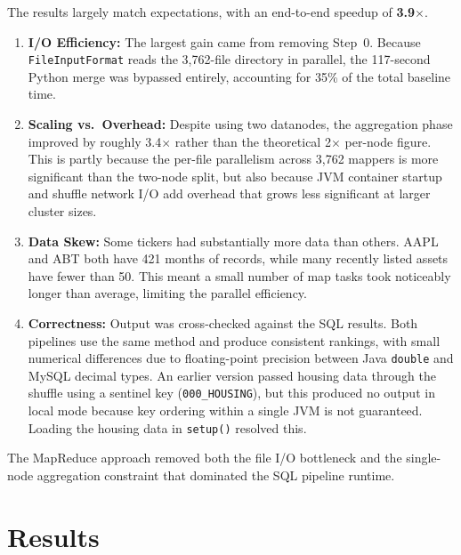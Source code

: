 \documentclass[11pt]{article}
\begin{document}
The results largely match expectations, with an end-to-end speedup of \textbf{3.9$\times$}.

\begin{enumerate}

\item \textbf{I/O Efficiency:} The largest gain came from removing Step~0. Because \texttt{FileInputFormat} reads the 3,762-file directory in parallel, the 117-second Python merge was bypassed entirely, accounting for 35\% of the total baseline time.

\item \textbf{Scaling vs.\ Overhead:} Despite using two datanodes, the aggregation phase improved by roughly 3.4$\times$ rather than the theoretical 2$\times$ per-node figure. This is partly because the per-file parallelism across 3,762 mappers is more significant than the two-node split, but also because JVM container startup and shuffle network I/O add overhead that grows less significant at larger cluster sizes.

\item \textbf{Data Skew:} Some tickers had substantially more data than others. AAPL and ABT both have 421 months of records, while many recently listed assets have fewer than 50. This meant a small number of map tasks took noticeably longer than average, limiting the parallel efficiency.

\item \textbf{Correctness:} Output was cross-checked against the SQL results. Both pipelines use the same method and produce consistent rankings, with small numerical differences due to floating-point precision between Java \texttt{double} and MySQL decimal types. An earlier version passed housing data through the shuffle using a sentinel key (\texttt{000\_HOUSING}), but this produced no output in local mode because key ordering within a single JVM is not guaranteed. Loading the housing data in \texttt{setup()} resolved this.

\end{enumerate}

The MapReduce approach removed both the file I/O bottleneck and the single-node aggregation constraint that dominated the SQL pipeline runtime.

\section{Results}
\end{document}
